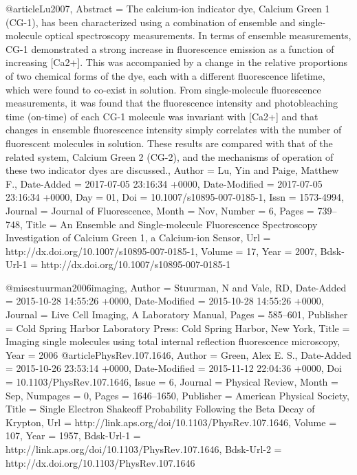 {{{{{{{{{@article{Lu2007,
	Abstract = {The calcium-ion indicator dye, Calcium Green 1 (CG-1), has been characterized using a combination of ensemble and single-molecule optical spectroscopy measurements. In terms of ensemble measurements, CG-1 demonstrated a strong increase in fluorescence emission as a function of increasing [Ca2+]. This was accompanied by a change in the relative proportions of two chemical forms of the dye, each with a different fluorescence lifetime, which were found to co-exist in solution. From single-molecule fluorescence measurements, it was found that the fluorescence intensity and photobleaching time (on-time) of each CG-1 molecule was invariant with [Ca2+] and that changes in ensemble fluorescence intensity simply correlates with the number of fluorescent molecules in solution. These results are compared with that of the related system, Calcium Green 2 (CG-2), and the mechanisms of operation of these two indicator dyes are discussed.},
	Author = {Lu, Yin and Paige, Matthew F.},
	Date-Added = {2017-07-05 23:16:34 +0000},
	Date-Modified = {2017-07-05 23:16:34 +0000},
	Day = {01},
	Doi = {10.1007/s10895-007-0185-1},
	Issn = {1573-4994},
	Journal = {Journal of Fluorescence},
	Month = {Nov},
	Number = {6},
	Pages = {739--748},
	Title = {An Ensemble and Single-molecule Fluorescence Spectroscopy Investigation of Calcium Green 1, a Calcium-ion Sensor},
	Url = {http://dx.doi.org/10.1007/s10895-007-0185-1},
	Volume = {17},
	Year = {2007},
	Bdsk-Url-1 = {http://dx.doi.org/10.1007/s10895-007-0185-1}}

@misc{stuurman2006imaging,
	Author = {Stuurman, N and Vale, RD},
	Date-Added = {2015-10-28 14:55:26 +0000},
	Date-Modified = {2015-10-28 14:55:26 +0000},
	Journal = {Live Cell Imaging, A Laboratory Manual},
	Pages = {585--601},
	Publisher = {Cold Spring Harbor Laboratory Press: Cold Spring Harbor, New York},
	Title = {Imaging single molecules using total internal reflection fluorescence microscopy},
	Year = {2006}}
@article{PhysRev.107.1646,
	Author = {Green, Alex E. S.},
	Date-Added = {2015-10-26 23:53:14 +0000},
	Date-Modified = {2015-11-12 22:04:36 +0000},
	Doi = {10.1103/PhysRev.107.1646},
	Issue = {6},
	Journal = {Physical Review},
	Month = {Sep},
	Numpages = {0},
	Pages = {1646--1650},
	Publisher = {American Physical Society},
	Title = {Single Electron Shakeoff Probability Following the Beta Decay of Krypton},
	Url = {http://link.aps.org/doi/10.1103/PhysRev.107.1646},
	Volume = {107},
	Year = {1957},
	Bdsk-Url-1 = {http://link.aps.org/doi/10.1103/PhysRev.107.1646},
	Bdsk-Url-2 = {http://dx.doi.org/10.1103/PhysRev.107.1646}}
	
}}}}}}}}}
